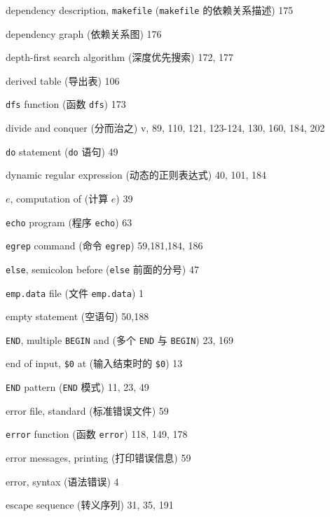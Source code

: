 \begin{multicols}{2}
\hangindent=2pc  dependency description, \verb'makefile'
(\verb'makefile' 的依赖关系描述) 175

\hangindent=2pc  dependency graph (依赖关系图) 176

\hangindent=2pc  depth-first search algorithm (深度优先搜索) 172, 177

\hangindent=2pc  derived table (导出表) 106

\hangindent=2pc  \verb'dfs' function (函数 \verb'dfs') 173

\hangindent=2pc  divide and conquer (分而治之) v, 89, 110, 121, 123-124, 130, 160, 184, 202

\hangindent=2pc  \verb'do' statement (\verb'do' 语句) 49

\hangindent=2pc  dynamic regular expression (动态的正则表达式) 40,  101, 184

\hangindent=2pc  $e$, computation of (计算 $e$) 39

\hangindent=2pc  \verb'echo' program (程序 \verb'echo') 63

\hangindent=2pc  \verb'egrep' command (命令 \verb'egrep') 59,181,184, 186

\hangindent=2pc  \verb'else', semicolon before (\verb'else'
前面的分号) 47

\hangindent=2pc  \verb'emp.data' file (文件 \verb'emp.data') 1

\hangindent=2pc  empty statement (空语句) 50,188

\hangindent=2pc  \verb'END', multiple \verb'BEGIN' and (多个
\verb'END' 与 \verb'BEGIN') 23, 169

\hangindent=2pc  end of input, \verb'$0' at (输入结束时的
\verb'$0') 13

\hangindent=2pc  \verb'END' pattern (\verb'END' 模式) 11, 23, 49

\hangindent=2pc  error file, standard (标准错误文件) 59

\hangindent=2pc  \verb'error' function (函数 \verb'error')
118, 149, 178

\hangindent=2pc  error messages, printing (打印错误信息) 59

\hangindent=2pc  error, syntax (语法错误) 4

\hangindent=2pc  escape sequence (转义序列) 31, 35, 191


\end{multicols}
